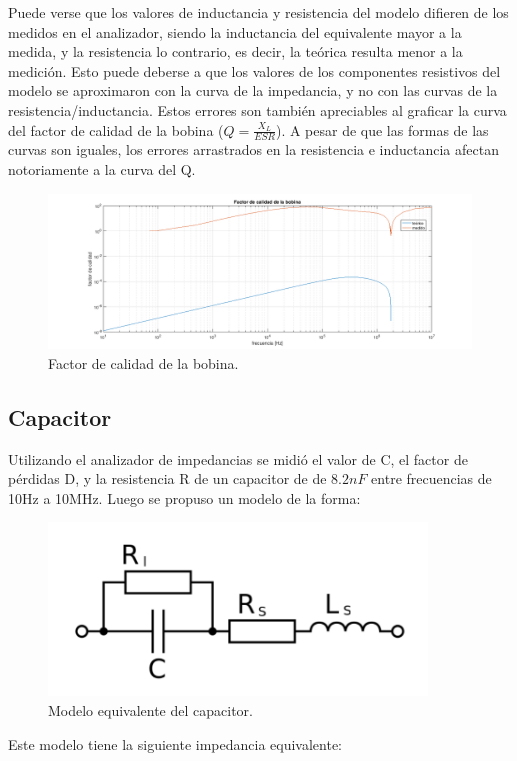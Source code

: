 Puede verse que los valores de inductancia y resistencia del modelo difieren de los medidos en el analizador, siendo la inductancia del equivalente mayor a la medida, y la resistencia lo contrario, es decir, la teórica resulta menor a la medición.  Esto puede deberse a que los valores de los componentes resistivos del modelo se aproximaron con la curva de la impedancia, y no con las curvas de la resistencia/inductancia.
Estos errores son también apreciables al graficar la curva del factor de calidad de la bobina ($Q=\frac{X_L}{ESR}$). A pesar de que las formas de las curvas son iguales, los errores arrastrados en la resistencia e inductancia afectan notoriamente a la curva del Q.

\begin{figure}[H]
\centering
\includegraphics[scale=0.5]{QdelL.png}
\caption{Factor de calidad de la bobina.}
\label{fig:QdelL}
\end{figure}

\subsection{Capacitor}

Utilizando el analizador de impedancias se midió el valor de C, el factor de pérdidas D, y la resistencia R de un capacitor de de $8.2nF$ entre frecuencias de 10Hz a 10MHz. Luego se propuso un modelo de la forma:

\begin{figure}[H]
\centering
\includegraphics[scale=0.5]{modeloC.png}
\caption{Modelo equivalente del capacitor.}
\label{fig:modeloC}
\end{figure}
Este modelo tiene la siguiente impedancia equivalente:

